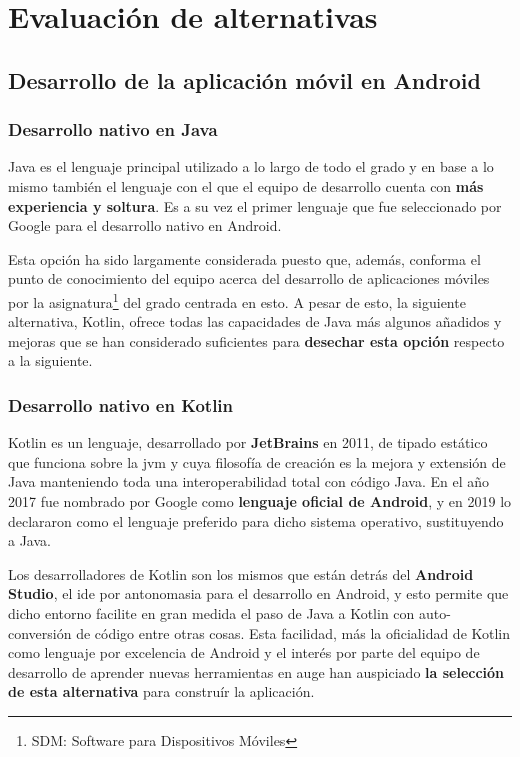 \chapter{Evaluación de alternativas}
\label{ch:evaluacion_alternativas}

\section{Desarrollo de la aplicación móvil en Android}

\subsection{Desarrollo nativo en Java}

Java es el lenguaje principal utilizado a lo largo de todo el grado y en base a lo mismo también el lenguaje con el que el equipo de desarrollo cuenta con \textbf{más experiencia y soltura}. Es a su vez el primer lenguaje que fue seleccionado por Google para el desarrollo nativo en Android.

Esta opción ha sido largamente considerada puesto que, además, conforma el punto de conocimiento del equipo acerca del desarrollo de aplicaciones móviles por la asignatura\footnote{SDM: Software para Dispositivos Móviles} del grado centrada en esto. A pesar de esto, la siguiente alternativa, Kotlin, ofrece todas las capacidades de Java más algunos añadidos y mejoras que se han considerado suficientes para \textbf{desechar esta opción} respecto a la siguiente.

\subsection{Desarrollo nativo en Kotlin}

Kotlin es un lenguaje, desarrollado por \textbf{JetBrains} en 2011, de tipado estático que funciona sobre la \acrlong{jvm} y cuya filosofía de creación es la mejora y extensión de Java manteniendo toda una interoperabilidad total con código Java. En el año 2017 fue nombrado por Google como \textbf{lenguaje oficial de Android}\cite{kotlin2017}, y en 2019 lo declararon como el lenguaje preferido para dicho sistema operativo\cite{kotlin2019}, sustituyendo a Java.

Los desarrolladores de Kotlin son los mismos que están detrás del \textbf{Android Studio}, el \acrshort{ide} por antonomasia para el desarrollo en Android, y esto permite que dicho entorno facilite en gran medida el paso de Java a Kotlin con auto-conversión de código entre otras cosas. Esta facilidad, más la oficialidad de Kotlin como lenguaje por excelencia de Android y el interés por parte del equipo de desarrollo de aprender nuevas herramientas en auge han auspiciado \textbf{la selección de esta alternativa} para construír la aplicación.

